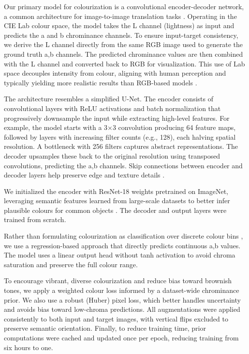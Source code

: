 \documentclass{article} %
\begin{document}
Our primary model for colourization is a convolutional encoder-decoder network, a common architecture for image-to-image translation tasks \citep{leatvanich2025image}. Operating in 
the CIE Lab colour space, the model takes the L channel (lightness) as input and predicts the a and b chrominance channels. To ensure input-target consistency, we derive the L channel 
directly from the same RGB image used to generate the ground truth a,b channels. The predicted chrominance values are then combined with the L channel and converted back to RGB for 
visualization. This use of Lab space decouples intensity from colour, aligning with human perception and typically yielding more realistic results than RGB-based models \citep{leatvanich2025image}.

The architecture resembles a simplified U-Net. The encoder consists of convolutional layers with ReLU activations and batch normalization that progressively downsample the input while 
extracting high-level features. For example, the model starts with a 3×3 convolution producing 64 feature maps, followed by layers with increasing filter counts (e.g., 128), each halving 
spatial resolution. A bottleneck with 256 filters captures abstract representations. The decoder upsamples these back to the original resolution using transposed convolutions, predicting 
the a,b channels. Skip connections between encoder and decoder layers help preserve edge and texture details \citep{leatvanich2025image}.

We initialized the encoder with ResNet-18 weights pretrained on ImageNet, leveraging semantic features learned from large-scale datasets to better infer plausible colours for common 
objects \citep{olah2022lettherebecolor}. The decoder and output layers were trained from scratch.

Rather than formulating colourization as classification over discrete colour bins \citep{olah2022lettherebecolor}, we use a regression-based approach that directly predicts continuous 
a,b values. The model uses a linear output head without tanh activation to avoid chroma saturation and preserve the full colour range.

To encourage vibrant, diverse colourization and reduce bias toward brownish tones, we apply a weighted colour loss informed by a dataset-wide chrominance prior. We also use a robust 
(Huber) pixel loss, which better handles uncertainty and avoids bias toward low-chroma predictions. All augmentations were applied consistently to both input and target images, with 
vertical flips excluded to preserve semantic orientation. Finally, to reduce training time, prior computations were cached and updated once per epoch, reducing training from six hours to one.
\end{document}
